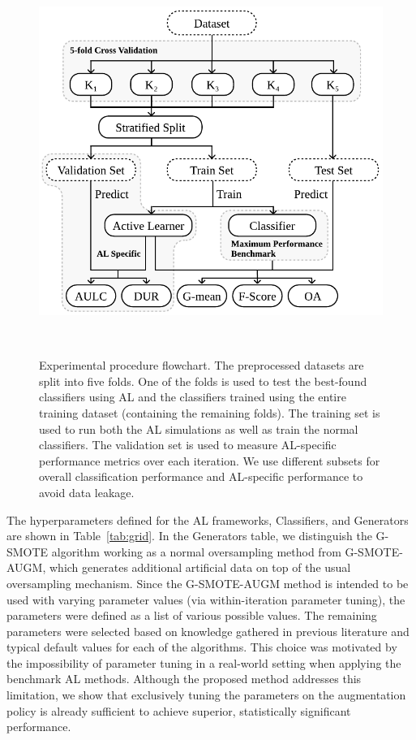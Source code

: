 \begin{figure}
	\centering
	\includegraphics[width=.6\linewidth]{experimental_procedure}
    \caption[Experimental procedure flowchart.]{%
        Experimental procedure flowchart. The preprocessed datasets are split
        into five folds. One of the folds is used to test the best-found
        classifiers using AL and the classifiers trained using the entire
        training dataset (containing the remaining folds). The training set is
        used to run both the AL simulations as well as train the normal
        classifiers. The validation set is used to measure AL-specific
        performance metrics over each iteration. We use different subsets for
        overall classification performance and AL-specific performance to
        avoid data leakage.
    }~\label{fig:experimental_procedure}
\end{figure}

The hyperparameters defined for the AL frameworks, Classifiers, and Generators
are shown in Table~\ref{tab:grid}. In the Generators table, we distinguish the
G-SMOTE algorithm working as a normal oversampling method from G-SMOTE-AUGM,
which generates additional artificial data on top of the usual oversampling
mechanism. Since the G-SMOTE-AUGM method is intended to be used with varying
parameter values (via within-iteration parameter tuning), the parameters were
defined as a list of various possible values. The remaining parameters
were selected based on knowledge gathered in previous literature and
typical default values for each of the algorithms. This choice was motivated
by the impossibility of parameter tuning in a real-world setting when applying
the benchmark AL methods. Although the proposed method addresses this
limitation, we show that exclusively tuning the parameters on the augmentation
policy is already sufficient to achieve superior, statistically significant
performance.

